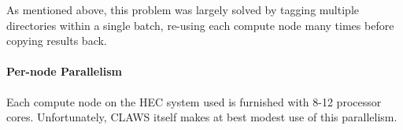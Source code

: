 As mentioned above, this problem was largely solved by tagging multiple directories within a single batch, re-using each compute node many times before copying results back.

\paragraph{Per-node Parallelism}
Each compute node on the HEC system used is furnished with 8-12 processor cores.  Unfortunately, CLAWS itself makes at best modest use of this parallelism.






